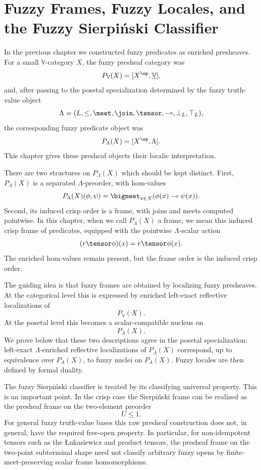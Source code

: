 \chapter{Fuzzy Frames, Fuzzy Locales, and the Fuzzy Sierpiński Classifier}
\label{ch:fuzzy-frames-locales}

In the previous chapter we constructed fuzzy predicates as enriched presheaves. For a
small \(\mathbb V\)-category \(X\), the fuzzy presheaf category was
\[
    P_{\mathbb V}(X)
    =
    [X^{\op},\underline{\mathbb V}],
\]
and, after passing to the posetal specialization determined by the fuzzy truth-value
object
\[
    \Lambda=(L,\leq,\meet,\join,\tensor,\multimap,\bot_L,\top_L),
\]
the corresponding fuzzy predicate object was
\[
    P_\Lambda(X)
    =
    [X^{\op},\Lambda].
\]
This chapter gives these presheaf objects their localic interpretation.

There are two structures on \(P_\Lambda(X)\) which should be kept distinct. First,
\(P_\Lambda(X)\) is a separated \(\Lambda\)-preorder, with hom-values
\[
    P_\Lambda(X)(\phi,\psi)
    =
    \bigmeet_{x\in X}(\phi(x)\multimap\psi(x)).
\]
Second, its induced crisp order is a frame, with joins and meets computed pointwise.
In this chapter, when we call \(P_\Lambda(X)\) a frame, we mean this induced crisp
frame of predicates, equipped with the pointwise \(\Lambda\)-scalar action
\[
    (r\tensor\phi)(x)=r\tensor\phi(x).
\]
The enriched hom-values remain present, but the frame order is the induced crisp
order.

The guiding idea is that fuzzy frames are obtained by localizing fuzzy presheaves. At
the categorical level this is expressed by enriched left-exact reflective
localizations of
\[
    P_{\mathbb V}(X).
\]
At the posetal level this becomes a scalar-compatible nucleus on
\[
    P_\Lambda(X).
\]
We prove below that these two descriptions agree in the posetal specialization:
left-exact \(\Lambda\)-enriched reflective localizations of \(P_\Lambda(X)\)
correspond, up to equivalence over \(P_\Lambda(X)\), to fuzzy nuclei on
\(P_\Lambda(X)\). Fuzzy locales are then defined by formal duality.

The fuzzy Sierpiński classifier is treated by its classifying universal property. This
is an important point. In the crisp case the Sierpiński frame can be realized as the
presheaf frame on the two-element preorder
\[
    U\leq 1.
\]
For general fuzzy truth-value bases this raw presheaf construction does not, in
general, have the required free-open property. In particular, for non-idempotent
tensors such as the {\L}ukasiewicz and product tensors, the presheaf frame on the
two-point subterminal shape need not classify arbitrary fuzzy opens by
finite-meet-preserving scalar frame homomorphisms.

